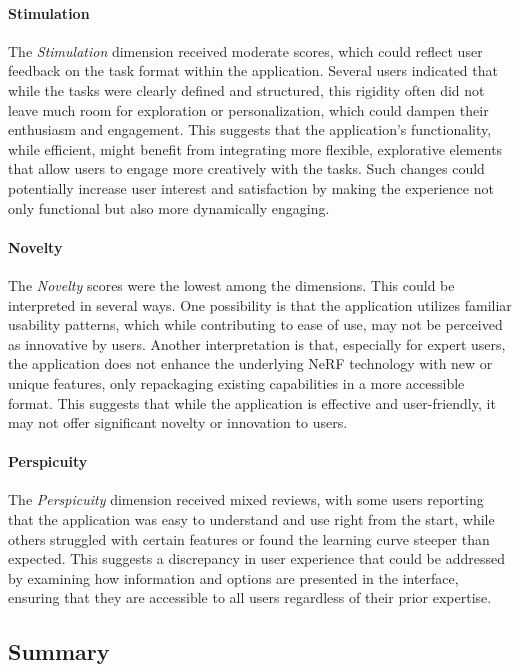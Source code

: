\paragraph{Stimulation}
The \emph{Stimulation} dimension received moderate scores, which could reflect user feedback on the task format within the application. 
Several users indicated that while the tasks were clearly defined and structured, this rigidity often did not leave much room for exploration or personalization, which could dampen their enthusiasm and engagement. 
This suggests that the application's functionality, while efficient, might benefit from integrating more flexible, explorative elements that allow users to engage more creatively with the tasks. 
Such changes could potentially increase user interest and satisfaction by making the experience not only functional but also more dynamically engaging.

\paragraph{Novelty}
The \emph{Novelty} scores were the lowest among the dimensions. This could be interpreted in several ways. 
One possibility is that the application utilizes familiar usability patterns, which while contributing to ease of use, may not be perceived as innovative by users. 
Another interpretation is that, especially for expert users, the application does not enhance the underlying NeRF technology with new or unique features, only repackaging existing capabilities in a more accessible format. 
This suggests that while the application is effective and user-friendly, it may not offer significant novelty or innovation to users.

\paragraph{Perspicuity}
The \emph{Perspicuity} dimension received mixed reviews, with some users reporting that the application was easy to understand and use right from the start, while others struggled with certain features or found the learning curve steeper than expected. 
This suggests a discrepancy in user experience that could be addressed by examining how information and options are presented in the interface, ensuring that they are accessible to all users regardless of their prior expertise.

\subsection*{Summary}
\label{subsec:findings:summary}

